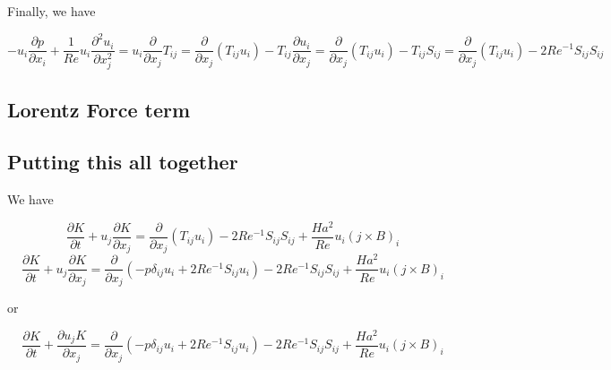 \documentclass[11pt]{article}
\begin{document}
Finally, we have

\begin{equation}
	-u_i \frac{\partial p}{\partial x_i}
	+ \frac{1}{Re}u_i
	\frac{\partial^2 u_i}{\partial x_j^2}
	=
	u_i \frac{\partial}{\partial x_j} T_{ij}
	=
	\frac{\partial}{\partial x_j} (T_{ij} u_i)
	-
	T_{ij} \frac{\partial u_i}{\partial x_j}
	=
	\frac{\partial}{\partial x_j} (T_{ij} u_i)
	- T_{ij} S_{ij}
	=
	\frac{\partial}{\partial x_j} (T_{ij} u_i)
	-
	2 Re^{-1} S_{ij} S_{ij}
\end{equation}


\subsection{Lorentz Force term}

\subsection{Putting this all together}
We have

\begin{equation}
	\frac{\partial K}{\partial t}
	+
	u_j \frac{\partial K}{\partial x_j}
	= 
	\frac{\partial}{\partial x_j} (T_{ij} u_i)
	-
	2 Re^{-1} S_{ij} S_{ij}
	+
	\frac{Ha^2}{Re}
	u_i
	(j \times B)_i
\end{equation}
\begin{equation}
	\boxed{
	\frac{\partial K}{\partial t}
	+
	u_j \frac{\partial K}{\partial x_j}
	= 
	\frac{\partial}{\partial x_j} 
	(
	-p \delta_{ij}
	u_i
	+
	2 Re^{-1}
	S_{ij}
	u_i
	)
	-
	2 Re^{-1} S_{ij} S_{ij}
	+
	\frac{Ha^2}{Re}
	u_i
	(j \times B)_i
	}
\end{equation}

or

\begin{equation}
	\boxed{
	\frac{\partial K}{\partial t}
	+
	\frac{\partial u_j K}{\partial x_j}
	= 
	\frac{\partial}{\partial x_j} 
	(
	-p \delta_{ij}
	u_i
	+
	2 Re^{-1}
	S_{ij}
	u_i
	)
	-
	2 Re^{-1} S_{ij} S_{ij}
	+
	\frac{Ha^2}{Re}
	u_i
	(j \times B)_i
	}
\end{equation}
\end{document}
